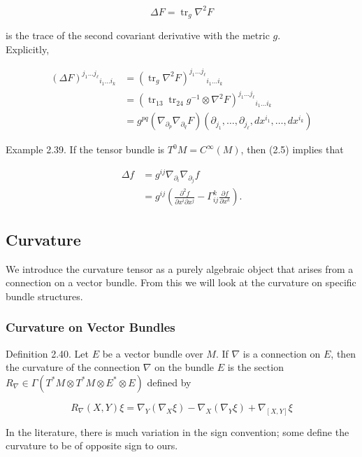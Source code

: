 \documentclass[10pt, letterpaper]{article}
\begin{document}
$$
\Delta F=\operatorname{tr}_{g} \nabla^{2} F
$$

is the trace of the second covariant derivative with the metric $g$.\\
Explicitly,

$$
\begin{aligned}
(\Delta F)^{j_{1} \ldots j_{\ell}}{ }_{i_{1} \ldots i_{k}} & =\left(\operatorname{tr}_{g} \nabla^{2} F\right)^{j_{1} \ldots j_{\ell}}{ }_{i_{1} \ldots i_{k}} \\
& =\left(\operatorname{tr}_{13} \operatorname{tr}_{24} g^{-1} \otimes \nabla^{2} F\right)^{j_{1} \ldots j_{\ell}}{ }_{i_{1} \ldots i_{k}} \\
& =g^{p q}\left(\nabla_{\partial_{p}} \nabla_{\partial_{q}} F\right)\left(\partial_{j_{1}}, \ldots, \partial_{j_{\ell}}, d x^{i_{1}}, \ldots, d x^{i_{k}}\right)
\end{aligned}
$$

Example 2.39. If the tensor bundle is $T^{0} M=C^{\infty}(M)$, then (2.5) implies that

$$
\begin{aligned}
\Delta f & =g^{i j} \nabla_{\partial_{i}} \nabla_{\partial_{j}} f \\
& =g^{i j}\left(\frac{\partial^{2} f}{\partial x^{i} \partial x^{j}}-\Gamma_{i j}^{k} \frac{\partial f}{\partial x^{k}}\right) .
\end{aligned}
$$

\subsection*{Curvature}
We introduce the curvature tensor as a purely algebraic object that arises from a connection on a vector bundle. From this we will look at the curvature on specific bundle structures.

\subsubsection*{Curvature on Vector Bundles}
Definition 2.40. Let $E$ be a vector bundle over $M$. If $\nabla$ is a connection on $E$, then the curvature of the connection $\nabla$ on the bundle $E$ is the section $R_{\nabla} \in \Gamma\left(T^{*} M \otimes T^{*} M \otimes E^{*} \otimes E\right)$ defined by

$$
R_{\nabla}(X, Y) \xi=\nabla_{Y}\left(\nabla_{X} \xi\right)-\nabla_{X}\left(\nabla_{Y} \xi\right)+\nabla_{[X, Y]} \xi
$$

In the literature, there is much variation in the sign convention; some define the curvature to be of opposite sign to ours.
\end{document}
